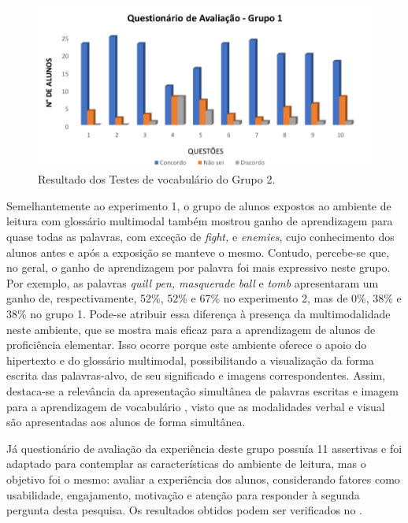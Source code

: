 \begin{figure}[htpb]
    \centering
    \begin{minipage}{.75\textwidth}
    \includegraphics[width=\textwidth]{graph-03.png}
    \caption{Resultado dos Testes de vocabulário do Grupo 2.}
    \label{graph-03}
    \end{minipage}
\end{figure}

Semelhantemente ao experimento 1, o grupo de alunos expostos ao ambiente
de leitura com glossário multimodal também mostrou ganho de aprendizagem
para quase todas as palavras, com exceção de \emph{fight,} e
\emph{enemies}, cujo conhecimento dos alunos antes e após a exposição se
manteve o mesmo. Contudo, percebe-se que, no geral, o ganho de
aprendizagem por palavra foi mais expressivo neste grupo. Por exemplo,
as palavras \emph{quill pen, masquerade ball} e \emph{tomb} apresentaram
um ganho de, respectivamente, 52\%, 52\% e 67\% no experimento 2, mas de
0\%, 38\% e 38\% no grupo 1. Pode-se atribuir essa diferença à presença
da multimodalidade neste ambiente, que se mostra mais eficaz para a
aprendizagem de alunos de proficiência elementar. Isso ocorre porque
este ambiente oferece o apoio do hipertexto e do glossário multimodal,
possibilitando a visualização da forma escrita das palavras-alvo, de seu
significado e imagens correspondentes. Assim, destaca-se a relevância da
apresentação simultânea de palavras escritas e imagem para a
aprendizagem de vocabulário \cite{mayer2001}, visto que as modalidades
verbal e visual são apresentadas aos alunos de forma simultânea.

Já questionário de avaliação da experiência deste grupo possuía 11
assertivas e foi adaptado para contemplar as características do ambiente
de leitura, mas o objetivo foi o mesmo: avaliar a experiência dos
alunos, considerando fatores como usabilidade, engajamento, motivação e
atenção para responder à segunda pergunta desta pesquisa. Os resultados
obtidos podem ser verificados no .

